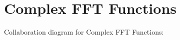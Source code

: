 \hypertarget{group__ComplexFFT}{}\section{Complex F\+FT Functions}
\label{group__ComplexFFT}
Collaboration diagram for Complex F\+FT Functions\+:
